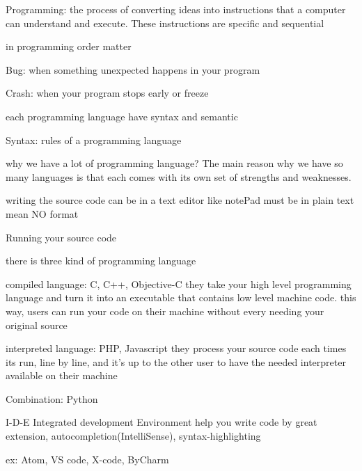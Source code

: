 Programming:
  the process of converting ideas into instructions that a computer can understand and execute.
  These instructions are specific and sequential

in programming order matter


Bug:
  when something unexpected happens in your program

Crash:
  when your program stops early or freeze


each programming language have syntax and semantic

Syntax:
  rules of a programming language


why we have a lot of programming language?
The main reason why we have so many languages is that each comes with its own set of strengths and weaknesses.

writing the source code
  can be in a text editor like notePad
  must be in plain text
  mean NO format

Running your source code

there is three kind of programming language

compiled language: C, C++, Objective-C
they take your high level programming language and turn it into an executable that contains low level machine code. this way, users can run your code on their machine without every needing your original source


interpreted language: PHP, Javascript
they process your source code each times its run, line by line, and it's up to the other user to have the needed interpreter available on their machine

Combination: Python


I-D-E
   Integrated development Environment
  help you write code by great extension, autocompletion(IntelliSense), syntax-highlighting 

  ex:
  Atom, VS code, X-code, ByCharm
